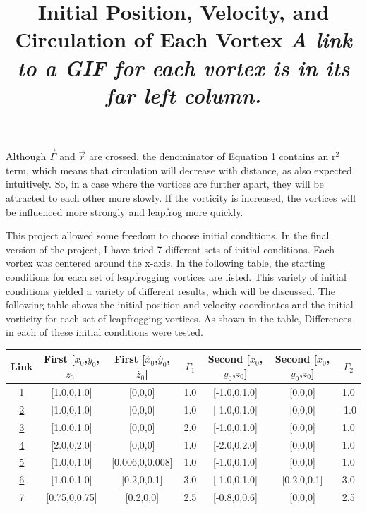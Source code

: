 \documentclass{article}
\begin{document}
Although $\vec{\Gamma}$ and $\vec{r}$ are crossed, the denominator of Equation 1 contains an r$^2$ term, which means that circulation will decrease with distance, as also expected intuitively. So, in a case where the vortices are further apart, they will be attracted to each other more slowly. If the vorticity is increased, the vortices will be influenced more strongly and leapfrog more quickly. \newline

This project allowed some freedom to choose initial conditions. In the final version of the project, I have tried 7 different sets of initial conditions. Each vortex was centered around the x-axis. In the following table, the starting conditions for each set of leapfrogging vortices are listed. This variety of initial conditions yielded a variety of different results, which will be discussed. The following table shows the initial position and velocity coordinates and the initial vorticity for each set of leapfrogging vortices. As shown in the table, Differences in each of these initial conditions were tested. \newline

\begin{table}
	\centering
	\title{Initial Position, Velocity, and Circulation of Each Vortex \newline}
	\title{\emph{A link to a GIF for each vortex is in its far left column.}}
	\begin{tabular}{ | c | c | c | c | c | c | c |}
		\hline
		Link & First [$x_0$,$y_0$,$z_0$] & First [$\dot{x_0}$,$\dot{y_0}$,$\dot{z_0}$] & $\Gamma_1$ & Second [$x_0$,$y_0$,$z_0$] & Second [$\dot{x_0}$,$\dot{y_0}$,$\dot{z_0}$] & $\Gamma_2$ \\ \hline
		\href{https://imgur.com/U4cND6X}{1} & [1.0,0,1.0] & [0,0,0] & 1.0 & [-1.0,0,1.0] & [0,0,0] & 1.0 \\ \hline
		\href{https://imgur.com/wSpWEQV}{2} & [1.0,0,1.0] & [0,0,0] & 1.0 & [-1.0,0,1.0] & [0,0,0] & -1.0 \\ \hline
		\href{https://imgur.com/aZzMnJV}{3} & [1.0,0,1.0] & [0,0,0] & 2.0 & [-1.0,0,1.0] & [0,0,0] & 1.0 \\ \hline
		\href{https://imgur.com/lviamWB}{4} & [2.0,0,2.0] & [0,0,0] & 1.0 & [-2.0,0,2.0] & [0,0,0] & 1.0 \\ \hline
		\href{https://imgur.com/UZyBsYO}{5} & [1.0,0,1.0] & [0.006,0,0.008] & 1.0 & [-1.0,0,1.0] & [0,0,0] & 1.0 \\ \hline
		\href{https://imgur.com/tctJPyS}{6} & [1.0,0,1.0] & [0.2,0,0.1] & 3.0 & [-1.0,0,1.0] & [0.2,0,0.1] & 3.0 \\ \hline
		\href{https://imgur.com/nKVGuJ9}{7} & [0.75,0,0.75] & [0.2,0,0] & 2.5 & [-0.8,0,0.6] & [0,0,0] & 2.5 \\ \hline
	\end{tabular}
\end{table}
\end{document}
